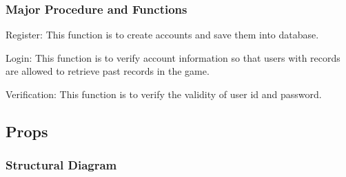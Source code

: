 \documentclass[11pt]{article}
\begin{document}
\subsubsection{Major Procedure and Functions}
Register: This function is to create accounts and save them into database.

Login: This function is to verify account information so that users with records are allowed to retrieve past records in the game.

Verification: This function is to verify the validity of user id and password.

\subsection{Props}
\subsubsection{Structural Diagram}
\end{document}
